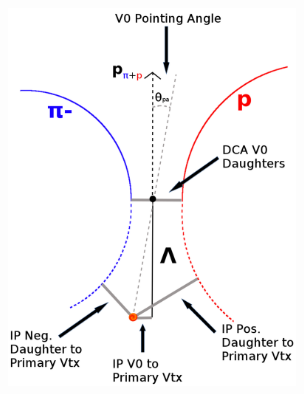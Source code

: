 \begin{figure}[h]
\begin{minipage}{18pc}
\includegraphics[width=18pc]{3_DataSelection/Figures/V0Cuts.pdf}
\end{minipage}\hspace{2pc}
\begin{minipage}{18pc}

\end{minipage}
\end{figure}
